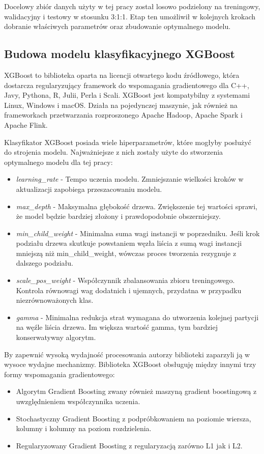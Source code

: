 \documentclass[polish, twoside, 12pt, a4paper]{article}
\theoremstyle{definition}
\theoremstyle{plain}
\theoremstyle{remark}
\begin{document}
Docelowy zbiór danych użyty w tej pracy został losowo podzielony na treningowy, walidacyjny i testowy w stosunku 3:1:1. Etap ten umożliwił w kolejnych krokach dobranie właściwych parametrów oraz zbudowanie optymalnego modelu.

\subsection{Budowa modelu klasyfikacyjnego XGBoost}

XGBoost to biblioteka oparta na licencji otwartego kodu źródłowego, która dostarcza regularyzujący framework do wspomagania gradientowego dla C++, Javy, Pythona, R, Julii, Perla i Scali. XGBoost jest kompatybilny z systemami Linux, Windows i macOS. Działa na pojedynczej maszynie, jak również na frameworkach przetwarzania rozproszonego Apache Hadoop, Apache Spark i Apache Flink. 

Klasyfikator XGBoost posiada wiele hiperparametrów, które mogłyby posłużyć do strojenia modelu. Najważniejsze z nich zostały użyte do stworzenia optymalnego modelu dla tej pracy:
\begin{itemize}
 \item \emph{learning\_rate} - Tempo uczenia modelu. Zmniejszanie wielkości kroków w aktualizacji zapobiega przeszacowaniu modelu.
 \item \emph{max\_depth} - Maksymalna głębokość drzewa. Zwiększenie tej wartości sprawi, że model będzie bardziej złożony i prawdopodobnie obszerniejszy.
 \item \emph{min\_child\_weight} - Minimalna suma wagi instancji w poprzedniku. Jeśli krok podziału drzewa skutkuje powstaniem węzła liścia z sumą wagi instancji mniejszą niż min\_child\_weight, wówczas proces tworzenia rezygnuje z dalszego podziału. 
 \item \emph{scale\_pos\_weight} - Współczynnik zbalansowania zbioru treningowego. Kontrola równowagi wag dodatnich i ujemnych, przydatna w przypadku niezrównoważonych klas.
 \item \emph{gamma} - Minimalna redukcja strat wymagana do utworzenia kolejnej partycji na węźle liścia drzewa. Im większa wartość gamma, tym bardziej konserwatywny algorytm.
\end{itemize}

By zapewnić wysoką wydajność procesowania autorzy biblioteki zaparzyli ją w wysoce wydajne mechanizmy. Biblioteka XGBoost obsługuję między innymi trzy formy wspomagania gradientowego:
\begin{itemize}
  \item Algorytm Gradient Boosting zwany również maszyną gradient boostingową z uwzględnieniem współczynnika uczenia.
  \item Stochastyczny Gradient Boosting z podpróbkowaniem na poziomie wiersza, kolumny i kolumny na poziom rozdzielenia.
  \item Regularyzowany Gradient Boosting z regularyzacją zarówno L1 jak i L2.
\end{itemize}
\end{document}
